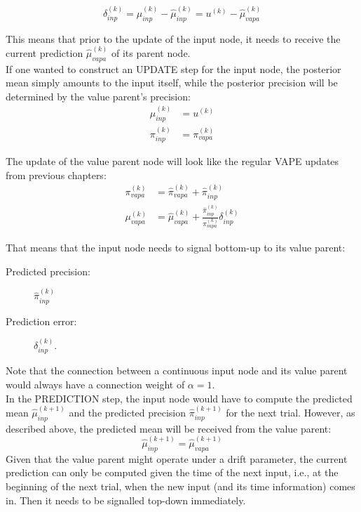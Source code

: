 \begin{equation}
	\delta_{inp}^{(k)} = \mu_{inp}^{(k)} - \hat{\mu}_{inp}^{(k)} = u^{(k)} - \hat{\mu}_{vapa}^{(k)}
\end{equation}

This means that prior to the update of the input node, it needs to receive the current prediction $\hat{\mu}_{vapa}^{(k)}$ of its parent node. \\

If one wanted to construct an \textsf{UPDATE step} for the input node, the posterior mean simply amounts to the input itself, while the posterior precision will be determined by the value parent's precision:
\begin{align}
	\mu_{inp}^{(k)} &= u^{(k)}\\
	\pi_{inp}^{(k)} &= \pi_{vapa}^{(k)}
\end{align}

The update of the value parent node will look like the regular \textsf{VAPE} updates from previous chapters:
\begin{align}
	\pi_{vapa}^{(k)} &= \hat{\pi}_{vapa}^{(k)} + \hat{\pi}_{inp}^{(k)}\\
	\mu_{vapa}^{(k)} &= \hat{\mu}_{vapa}^{(k)} + \frac{\hat{\pi}_{inp}^{(k)}}{\pi_{vapa}^{(k)}} \delta_{inp}^{(k)}
\end{align}

That means that the input node needs to signal bottom-up to its value parent:
\begin{description}
	\item[Predicted precision:] 		$\hat{\pi}_{inp}^{(k)}$
	\item[Prediction error:]			$\delta_{inp}^{(k)}$.
\end{description}

Note that the connection between a continuous input node and its value parent would always have a connection weight of $\alpha = 1$.\\

In the \textsf{PREDICTION step}, the input node would have to compute the predicted mean $\hat{\mu}_{inp}^{(k+1)}$ and the predicted precision $\hat{\pi}_{inp}^{(k+1)}$ for the next trial. However, as described above, the predicted mean will be received from the value parent: 
\begin{equation}
	\hat{\mu}_{inp}^{(k+1)} = \hat{\mu}_{vapa}^{(k+1)}
\end{equation}
Given that the value parent might operate under a drift parameter, the current prediction can only be computed given the time of the next input, i.e., at the beginning of the next trial, when the new input (and its time information) comes in. Then it needs to be signalled top-down immediately.\\

